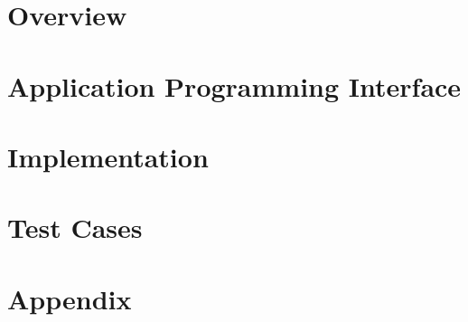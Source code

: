 \documentclass[a4paper, 10pt, twocolumn]{report}
\begin{document}
\part{Overview}
\part{Application Programming Interface}
\part{Implementation}
\part{Test Cases}
\part{Appendix}
\end{document}
